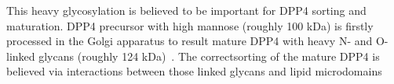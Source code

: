 This heavy glycosylation is believed to be important for DPP4 sorting and maturation. DPP4 precursor with high mannose (roughly 100 kDa) is firstly processed in the Golgi apparatus to result mature DPP4 with heavy N- and O-linked glycans (roughly 124 kDa)~\cite{Matter_1991}. The correctsorting of the mature DPP4 is believed via interactions between those linked glycans and lipid microdomains 